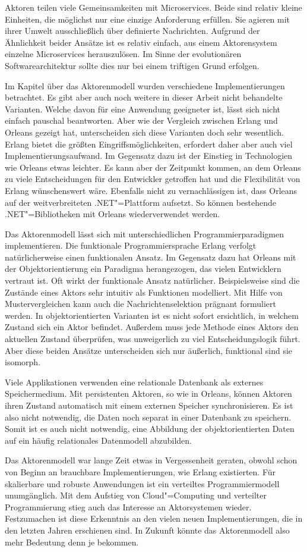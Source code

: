 Aktoren teilen viele Gemeinsamkeiten mit Microservices. Beide sind relativ kleine Einheiten, die möglichst nur eine einzige Anforderung erfüllen. Sie agieren mit ihrer Umwelt ausschließlich über definierte Nachrichten. Aufgrund der Ähnlichkeit beider Ansätze ist es relativ einfach, aus einem Aktorensystem einzelne Microservices herauszulösen. Im Sinne der evolutionären Softwarearchitektur sollte dies nur bei einem triftigen Grund erfolgen.

Im Kapitel über das Aktorenmodell wurden verschiedene Implementierungen betrachtet. Es gibt aber auch noch weitere in dieser Arbeit nicht behandelte Varianten. Welche davon für eine Anwendung geeigneter ist, lässt sich nicht einfach pauschal beantworten. Aber wie der Vergleich zwischen Erlang und Orleans gezeigt hat, unterscheiden sich diese Varianten doch sehr wesentlich. Erlang bietet die größten Eingriffsmöglichkeiten, erfordert daher aber auch viel Implementierungsaufwand. Im Gegensatz dazu ist der Einstieg in Technologien wie Orleans etwas leichter. Es kann aber der Zeitpunkt kommen, an dem Orleans zu viele Entscheidungen für den Entwickler getroffen hat und die Flexibilität von Erlang wünschenswert wäre. Ebenfalls nicht zu vernachlässigen ist, dass Orleans auf der weitverbreiteten .NET"=Plattform aufsetzt. So können bestehende .NET"=Bibliotheken mit Orleans wiederverwendet werden.

Das Aktorenmodell lässt sich mit unterschiedlichen Programmierparadigmen implementieren. Die funktionale Programmiersprache Erlang verfolgt natürlicherweise einen funktionalen Ansatz. Im Gegensatz dazu hat Orleans mit der Objektorientierung ein Paradigma herangezogen, das vielen Entwicklern vertraut ist. Oft wirkt der funktionale Ansatz natürlicher. Beispielsweise sind die Zustände eines Aktors sehr intuitiv als Funktionen modelliert. Mit Hilfe von Mustervergleichen kann auch die Nachrichtenselektion prägnant formuliert werden. In objektorientierten Varianten ist es nicht sofort ersichtlich, in welchem Zustand sich ein Aktor befindet. Außerdem muss jede Methode eines Aktors den aktuellen Zustand überprüfen, was unweigerlich zu viel Entscheidungslogik führt. Aber diese beiden Ansätze unterscheiden sich nur äußerlich, funktional sind sie isomorph.

Viele Applikationen verwenden eine relationale Datenbank als externes Speichermedium. Mit persistenten Aktoren, so wie in Orleans, können Aktoren ihren Zustand automatisch mit einem externen Speicher synchronisieren. Es ist also nicht notwendig, die Daten noch separat in einer Datenbank zu speichern. Somit ist es auch nicht notwendig, eine Abbildung der objektorientierten Daten auf ein häufig relationales Datenmodell abzubilden.

Das Aktorenmodell war lange Zeit etwas in Vergessenheit geraten, obwohl schon von Beginn an brauchbare Implementierungen, wie \zB Erlang existierten. Für skalierbare und robuste Anwendungen ist ein verteiltes Programmiermodell unumgänglich. Mit dem Aufstieg von Cloud"=Computing und verteilter Programmierung stieg auch das Interesse an Aktorsystemen wieder. Festzumachen ist diese Erkenntnis an den vielen neuen Implementierungen, die in den letzten Jahren erschienen sind. In Zukunft könnte das Aktorenmodell also mehr Bedeutung denn je bekommen.